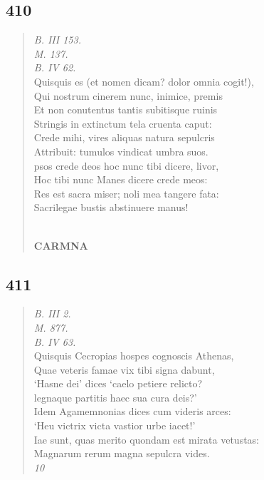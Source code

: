 \documentclass[11pt, a4paper]{report}
\begin{document}
            \subsection*{410}
      \begin{verse}
      \textit{B. III 153.} \\ \textit{M. 137.} \\ \textit{B. IV 62.} \\ Quisquis es (et nomen dicam? dolor omnia cogit!), \\ Qui nostrum cinerem nunc, inimice, premis \\ Et non conutentus tantis subitisque ruinis \\ Stringis in extinctum tela cruenta caput: \\ Crede mihi, vires aliquas natura sepulcris \\ Attribuit: tumulos vindicat umbra suos. \\ psos crede deos hoc nunc tibi dicere, livor, \\ Hoc tibi nunc Manes dicere crede meos: \\ Res est sacra miser; noli mea tangere fata: \\ Sacrilegae bustis abstinuere manus! \\ 
        ﻿\pagebreak 
    \begin{center} \textbf{CARMNA} \end{center} \marginpar{[318]} 
      \end{verse}
  
            \subsection*{411}
      \begin{verse}
      \textit{B. III 2.} \\ \textit{M. 877.} \\ \textit{B. IV 63.} \\ Quisquis Cecropias hospes cognoscis Athenas, \\ Quae veteris famae vix tibi signa dabunt, \\ ‘Hasne dei’ dices ‘caelo petiere relicto? \\ legnaque partitis haec sua cura deis?’ \\ Idem Agamemnonias dices cum videris arces: \\ ‘Heu victrix victa vastior urbe iacet!’ \\ Iae sunt, quas merito quondam est mirata vetustas: \\ Magnarum rerum magna sepulcra vides. \\ \textit{10} \\ 
      \end{verse}
  
\end{document}
